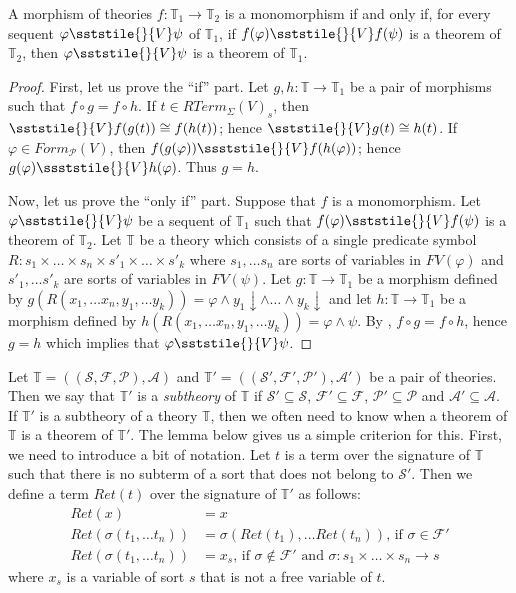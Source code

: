 \begin{prop}[mono]
A morphism of theories $f : \mathbb{T}_1 \to \mathbb{T}_2$ is a monomorphism if and only if, for every sequent $\varphi \sststile{}{V} \psi$ of $\mathbb{T}_1$,
if $f(\varphi) \sststile{}{V} f(\psi)$ is a theorem of $\mathbb{T}_2$, then $\varphi \sststile{}{V} \psi$ is a theorem of $\mathbb{T}_1$.
\end{prop}
\begin{proof}
First, let us prove the ``if'' part.
Let $g,h : \mathbb{T} \to \mathbb{T}_1$ be a pair of morphisms such that $f \circ g = f \circ h$.
If $t \in RTerm_\Sigma(V)_s$, then $\sststile{}{V} f(g(t)) \cong f(h(t))$; hence $\sststile{}{V} g(t) \cong h(t)$.
If $\varphi \in Form_\mathcal{P}(V)$, then $f(g(\varphi)) \ssststile{}{V} f(h(\varphi))$; hence $g(\varphi) \ssststile{}{V} h(\varphi)$.
Thus $g = h$.

Now, let us prove the ``only if'' part.
Suppose that $f$ is a monomorphism.
Let $\varphi \sststile{}{V} \psi$ be a sequent of $\mathbb{T}_1$ such that $f(\varphi) \sststile{}{V} f(\psi)$ is a theorem of $\mathbb{T}_2$.
Let $\mathbb{T}$ be a theory which consists of a single predicate symbol $R : s_1 \times \ldots \times s_n \times s'_1 \times \ldots \times s'_k$
where $s_1, \ldots s_n$ are sorts of variables in $FV(\varphi)$ and $s'_1, \ldots s'_k$ are sorts of variables in $FV(\psi)$.
Let $g : \mathbb{T} \to \mathbb{T}_1$ be a morphism defined by $g(R(x_1, \ldots x_n, y_1, \ldots y_k)) = \varphi \land y_1\!\downarrow \land \ldots \land y_k\!\downarrow$ and
let $h : \mathbb{T} \to \mathbb{T}_1$ be a morphism defined by $h(R(x_1, \ldots x_n, y_1, \ldots y_k)) = \varphi \land \psi$.
By , $f \circ g = f \circ h$, hence $g = h$ which implies that $\varphi \sststile{}{V} \psi$.
\end{proof}

Let $\mathbb{T} = ((\mathcal{S},\mathcal{F},\mathcal{P}),\mathcal{A})$ and $\mathbb{T}' = ((\mathcal{S}',\mathcal{F}',\mathcal{P}'),\mathcal{A}')$ be a pair of theories.
Then we say that $\mathbb{T}'$ is a \emph{subtheory} of $\mathbb{T}$ if $\mathcal{S}' \subseteq \mathcal{S}$, $\mathcal{F}' \subseteq \mathcal{F}$, $\mathcal{P}' \subseteq \mathcal{P}$ and $\mathcal{A}' \subseteq \mathcal{A}$.
If $\mathbb{T}'$ is a subtheory of a theory $\mathbb{T}$, then we often need to know when a theorem of $\mathbb{T}$ is a theorem of $\mathbb{T}'$.
The lemma below gives us a simple criterion for this.
First, we need to introduce a bit of notation.
Let $t$ is a term over the signature of $\mathbb{T}$ such that there is no subterm of a sort that does not belong to $\mathcal{S}'$.
Then we define a term $Ret(t)$ over the signature of $\mathbb{T}'$ as follows:
\begin{align*}
Ret(x) & = x \\
Ret(\sigma(t_1, \ldots t_n)) & = \sigma(Ret(t_1), \ldots Ret(t_n)) \text{, if $\sigma \in \mathcal{F}'$} \\
Ret(\sigma(t_1, \ldots t_n)) & = x_s \text{, if $\sigma \notin \mathcal{F}'$ and $\sigma : s_1 \times \ldots \times s_n \to s$}
\end{align*}
where $x_s$ is a variable of sort $s$ that is not a free variable of $t$.

